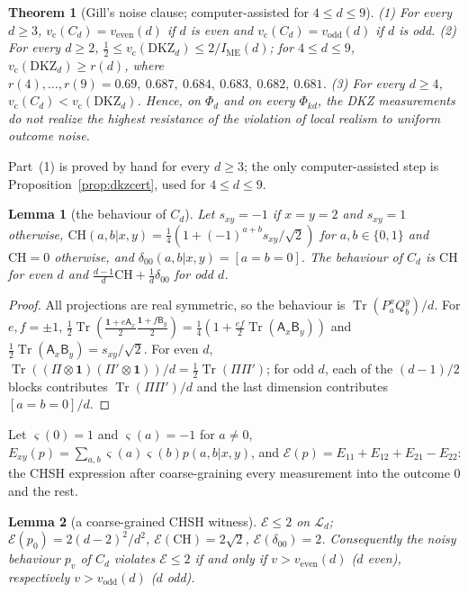 \documentclass[11pt]{article}
\newtheorem{theorem}{Theorem}
\newtheorem{lemma}{Lemma}[section]
\theoremstyle{remark}
\numberwithin{equation}{section}
\newcommand{\Tr}{\operatorname{Tr}}
\newcommand{\IME}{I_{\mathrm{ME}}}
\newcommand{\one}{\mathbf{1}}
\newcommand{\cL}{\mathcal{L}}
\newcommand{\cE}{\mathcal{E}}
\newcommand{\vc}{v_{\mathrm c}}
\newcommand{\veven}{v_{\mathrm{even}}}
\newcommand{\vodd}{v_{\mathrm{odd}}}
\newcommand{\CH}{\mathrm{CH}}
\newcommand{\DKZ}{\mathrm{DKZ}}
\newcommand{\sA}{\mathsf{A}}
\newcommand{\sB}{\mathsf{B}}
\begin{document}
\begin{theorem}[Gill's noise clause; computer-assisted for $4\le d\le9$]\label{thm:literal}
\textup{(1)} For every $d\ge3$, $\vc(C_d)=\veven(d)$ if $d$ is even and $\vc(C_d)=\vodd(d)$ if $d$ is odd.
\textup{(2)} For every $d\ge2$, $\frac12\le\vc(\DKZ_d)\le2/\IME(d)$; for $4\le d\le9$, $\vc(\DKZ_d)\ge r(d)$, where
$r(4),\dots,r(9)=0.69,\ 0.687,\ 0.684,\ 0.683,\ 0.682,\ 0.681$.
\textup{(3)} For every $d\ge4$, $\vc(C_d)<\vc(\DKZ_d)$. Hence, on $\Phi_d$ and on every $\Phi_{kd}$, the DKZ measurements
do not realize the highest resistance of the violation of local realism to uniform outcome noise.
\end{theorem}

Part~(1) is proved by hand for every $d\ge3$; the only computer-assisted step is Proposition~\ref{prop:dkzcert}, used for
$4\le d\le9$.

\begin{lemma}[the behaviour of $C_d$]\label{lem:Cbeh}
Let $s_{xy}=-1$ if $x=y=2$ and $s_{xy}=1$ otherwise, $\CH(a,b|x,y)=\frac14(1+(-1)^{a+b}s_{xy}/\sqrt2)$ for $a,b\in\{0,1\}$
and $\CH=0$ otherwise, and $\delta_{00}(a,b|x,y)=[a=b=0]$. The behaviour of $C_d$ is $\CH$ for even $d$ and
$\frac{d-1}d\CH+\frac1d\delta_{00}$ for odd $d$.
\end{lemma}

\begin{proof}
All projections are real symmetric, so the behaviour is $\Tr(P^x_aQ^y_b)/d$. For $e,f=\pm1$,
$\frac12\Tr(\frac{\one+e\sA_x}2\frac{\one+f\sB_y}2)=\frac14(1+\frac{ef}2\Tr(\sA_x\sB_y))$ and
$\frac12\Tr(\sA_x\sB_y)=s_{xy}/\sqrt2$. For even $d$, $\Tr((\Pi\otimes\one)(\Pi'\otimes\one))/d=\frac12\Tr(\Pi\Pi')$; for odd
$d$, each of the $(d-1)/2$ blocks contributes $\Tr(\Pi\Pi')/d$ and the last dimension contributes $[a=b=0]/d$.
\end{proof}

Let $\varsigma(0)=1$ and $\varsigma(a)=-1$ for $a\ne0$, $E_{xy}(p)=\sum_{a,b}\varsigma(a)\varsigma(b)p(a,b|x,y)$, and
$\cE(p)=E_{11}+E_{12}+E_{21}-E_{22}$: the CHSH expression after coarse-graining every measurement into the outcome $0$
and the rest.

\begin{lemma}[a coarse-grained CHSH witness]\label{lem:witness}
$\cE\le2$ on $\cL_d$; $\cE(p_0)=2(d-2)^2/d^2$, $\cE(\CH)=2\sqrt2$, $\cE(\delta_{00})=2$. Consequently the noisy behaviour
$p_v$ of $C_d$ violates $\cE\le2$ if and only if $v>\veven(d)$ \textup{(}$d$ even\textup{)}, respectively $v>\vodd(d)$
\textup{(}$d$ odd\textup{)}.
\end{lemma}
\end{document}
